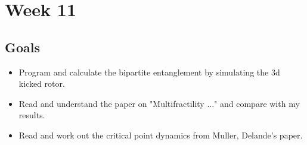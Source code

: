 \documentclass[12pt]{article}
\begin{document}
\section{Week 11}
\subsection{Goals}
\begin{itemize}
    \item Program and calculate the bipartite entanglement
    by simulating the 3d kicked rotor.

    \item Read and understand the paper on "Multifractility ..."
    and compare with my results.

    \item Read and work out the critical point dynamics from
    Muller, Delande's paper.
\end{itemize}

\nocite{*}
\printbibliography
\end{document}
